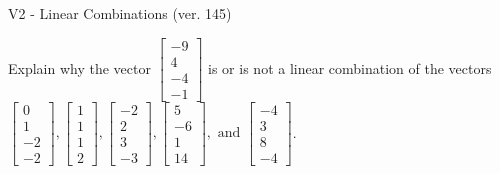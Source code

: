 \begin{exercise}
  \begin{exerciseTitle}V2 - Linear Combinations (ver. 145)\end{exerciseTitle}
  \begin{exerciseStatement}
    Explain why the vector \(\left[\begin{array}{c}
-9 \\
4 \\
-4 \\
-1
\end{array}\right]\)  is or is not a linear 
	combination of the vectors \(\left[\begin{array}{c}
0 \\
1 \\
-2 \\
-2
\end{array}\right] , \left[\begin{array}{c}
1 \\
1 \\
1 \\
2
\end{array}\right] , \left[\begin{array}{c}
-2 \\
2 \\
3 \\
-3
\end{array}\right] , \left[\begin{array}{c}
5 \\
-6 \\
1 \\
14
\end{array}\right] , \text{ and } \left[\begin{array}{c}
-4 \\
3 \\
8 \\
-4
\end{array}\right]\).
	



\end{exerciseStatement}
\end{exercise}
